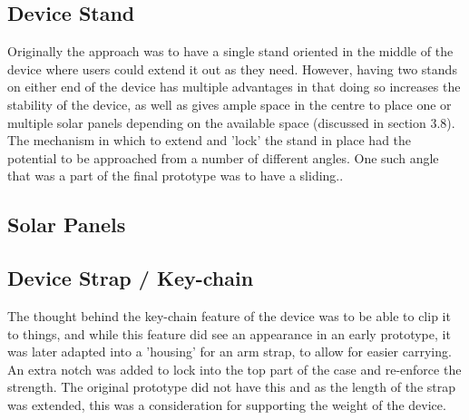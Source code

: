 \subsection{Device Stand}

Originally the approach was to have a single stand oriented in the middle of the device where users could extend it out as they need.
However, having two stands on either end of the device has multiple advantages in that doing so increases the stability of the device, as well as gives ample space in the centre to place one or multiple solar panels depending on the available space (discussed in section 3.8).
The mechanism in which to extend and 'lock' the stand in place had the potential to be approached from a number of different angles.
One such angle that was a part of the final prototype was to have a sliding..

\subsection{Solar Panels}


\subsection{Device Strap / Key-chain}

The thought behind the key-chain feature of the device was to be able to clip it to things, and while this feature did see an appearance in an early prototype, it was later adapted into a 'housing' for an arm strap, to allow for easier carrying.
An extra notch was added to lock into the top part of the case and re-enforce the strength. 
The original prototype did not have this and as the length of the strap was extended, this was a consideration for supporting the weight of the device.

